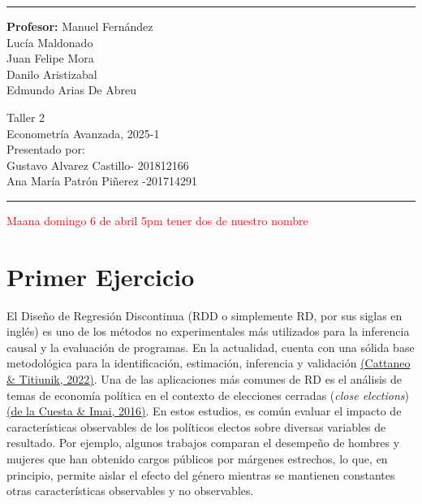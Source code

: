 \documentclass[a4paper, answers, addpoints, 11pt]{exam}
\begin{document}

\fancyhead[C]{}
\hrule \medskip 
\begin{minipage}{0.295\textwidth} 
\raggedright
\textbf{Profesor:} Manuel Fernández\\
\vspace{2mm}
Lucía Maldonado \\
Juan Felipe Mora \\
Danilo Aristizabal \\
Edmundo Arias De Abreu



\end{minipage}
\begin{minipage}{0.4\textwidth} 
\centering 
\huge 
Taller 2\\ 
\vspace{2mm}
\normalsize 
Econometría Avanzada, 2025-1\\ 
\vspace{2mm}
Presentado por: \\Gustavo Alvarez Castillo- 201812166\\
Ana María Patrón Piñerez -201714291

\end{minipage}

\medskip\hrule 
\bigskip
\textcolor{red}{Ma{ana domingo 6 de abril 5pm tener dos de nuestro nombre}}
\section*{Primer Ejercicio}

El Diseño de Regresión Discontinua (RDD o simplemente RD, por sus siglas en inglés) es uno de los métodos no experimentales más utilizados para la inferencia causal y la evaluación de programas. En la actualidad, cuenta con una sólida base metodológica para la identificación, estimación, inferencia y validación \href{https://arxiv.org/abs/2108.09400}{(Cattaneo \& Titiunik, 2022)}. Una de las aplicaciones más comunes de RD es el análisis de temas de economía política en el contexto de elecciones cerradas (\textit{close elections}) \href{https://www.annualreviews.org/content/journals/10.1146/annurev-polisci-032015-010115}{(de la Cuesta \& Imai, 2016)}. En estos estudios, es común evaluar el impacto de características observables de los políticos electos sobre diversas variables de resultado. Por ejemplo, algunos trabajos comparan el desempeño de hombres y mujeres que han obtenido cargos públicos por márgenes estrechos, lo que, en principio, permite aislar el efecto del género mientras se mantienen constantes otras características observables y no observables. \\
\end{document}
